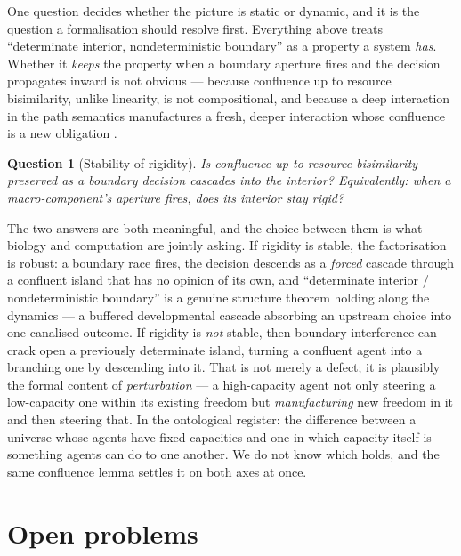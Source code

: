 \documentclass[11pt]{article}
\theoremstyle{definition}
\theoremstyle{plain}
\newtheorem{question}{Question}
\theoremstyle{remark}
\begin{document}
One question decides whether the picture is static or dynamic, and it is the question a
formalisation should resolve first. Everything above treats ``determinate interior,
nondeterministic boundary'' as a property a system \emph{has}. Whether it \emph{keeps}
the property when a boundary aperture fires and the decision propagates inward is not
obvious --- because confluence up to resource bisimilarity, unlike linearity, is not
compositional, and because a deep interaction in the path semantics manufactures a fresh,
deeper interaction whose confluence is a new obligation \cite{paths}.

\begin{question}[Stability of rigidity]\label{q:crux}
Is confluence up to resource bisimilarity preserved as a boundary decision cascades into
the interior? Equivalently: when a macro-component's aperture fires, does its interior
stay rigid?
\end{question}

\noindent
The two answers are both meaningful, and the choice between them is what biology and
computation are jointly asking. If rigidity is stable, the factorisation is robust: a
boundary race fires, the decision descends as a \emph{forced} cascade through a confluent
island that has no opinion of its own, and ``determinate interior / nondeterministic
boundary'' is a genuine structure theorem holding along the dynamics --- a buffered
developmental cascade absorbing an upstream choice into one canalised outcome. If rigidity
is \emph{not} stable, then boundary interference can crack open a previously determinate
island, turning a confluent agent into a branching one by descending into it. That is not
merely a defect;
it is plausibly the formal content of \emph{perturbation} --- a high-capacity agent not
only steering a low-capacity one within its existing freedom but \emph{manufacturing} new
freedom in it and then steering that. In the ontological register: the difference between a
universe whose agents have fixed capacities and one in which capacity itself is something
agents can do to one another. We do not know which holds, and the same confluence lemma
settles it on both axes at once.

\section{Open problems}\label{sec:open}
\end{document}
